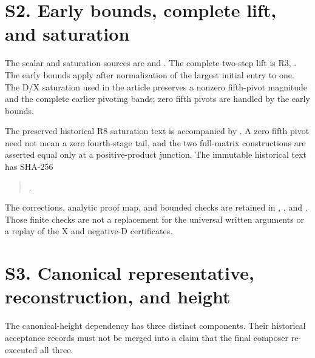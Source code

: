 \documentclass[10pt]{article}
\begin{document}
\section*{S2. Early bounds, complete lift, and saturation}

The scalar and saturation sources are
 and
.
The complete two-step lift is R3,
.
The early bounds apply after normalization of the largest initial
entry to one. The D/X saturation used in the article preserves a
nonzero fifth-pivot magnitude and the complete earlier pivoting bands;
zero fifth pivots are handled by the early bounds.

\begin{samepage}
The preserved historical R8 saturation text is accompanied by
.
A zero fifth pivot need not mean a zero fourth-stage tail, and the two
full-matrix constructions are asserted equal only at a positive-product
junction. The immutable historical text has SHA-256
\begin{quote}
.
\end{quote}
\end{samepage}
The corrections, analytic proof map, and bounded checks are retained in
,
, and
.
Those finite checks are not a replacement for the universal written
arguments or a replay of the X and negative-D certificates.

\section*{S3. Canonical representative, reconstruction, and height}

The canonical-height dependency has three distinct components.
Their historical acceptance records must not be merged into a claim
that the final composer re-executed all three.
\end{document}
